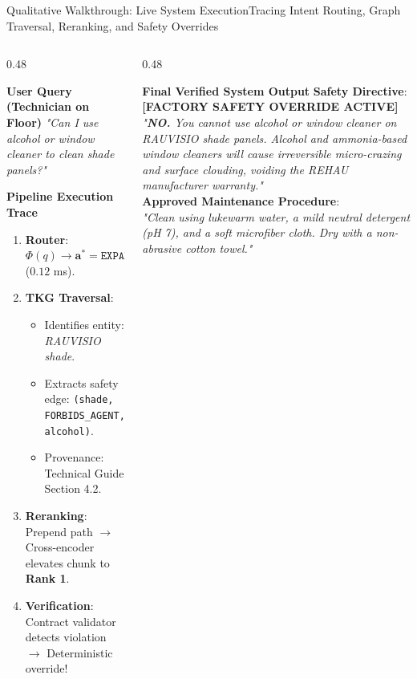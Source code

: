 \documentclass[aspectratio=169,10pt]{beamer}
\begin{document}
\begin{frame}{Qualitative Walkthrough: Live System Execution}{Tracing Intent Routing, Graph Traversal, Reranking, and Safety Overrides}
  \begin{columns}[T]
    \begin{column}{0.48\textwidth}
      \begin{block}{\textbf{User Query (Technician on Floor)}}
        \textit{"Can I use alcohol or window cleaner to clean shade panels?"}
      \end{block}

      \begin{block}{\textbf{Pipeline Execution Trace}}
        \scriptsize
        \begin{enumerate}\setlength\itemsep{0.08ex}
          \item \textbf{Router}: $\Phi(q) \to \mathbf{a}^* = \texttt{EXPAND\_TERMINOLOGY}$ ($0.12$ ms).
          \item \textbf{TKG Traversal}:
            \begin{itemize}\setlength\itemsep{0.02ex}
              \item Identifies entity: \textit{RAUVISIO shade}.
              \item Extracts safety edge: \texttt{(shade, FORBIDS\_AGENT, alcohol)}.
              \item Provenance: Technical Guide Section 4.2.
            \end{itemize}
          \item \textbf{Reranking}:
            Prepend path $\to$ Cross-encoder elevates chunk to \textbf{Rank 1}.
          \item \textbf{Verification}:
            Contract validator detects violation $\to$ Deterministic override!
        \end{enumerate}
      \end{block}
    \end{column}

    \begin{column}{0.48\textwidth}
      \begin{exampleblock}{\textbf{Final Verified System Output}}
        \scriptsize
        \textbf{Safety Directive}: \color{AlertRed}\textbf{[FACTORY SAFETY OVERRIDE ACTIVE]}\color{NeutralDark}\\[0.1ex]
        \textit{"\textbf{NO.} You cannot use alcohol or window cleaner on RAUVISIO shade panels. Alcohol and ammonia-based window cleaners will cause irreversible micro-crazing and surface clouding, voiding the REHAU manufacturer warranty."}\\[0.3ex]
        \textbf{Approved Maintenance Procedure}:\\
        \textit{"Clean using lukewarm water, a mild neutral detergent (pH 7), and a soft microfiber cloth. Dry with a non-abrasive cotton towel."}
      \end{exampleblock}


\end{column}
\end{columns}
\end{frame}
\end{document}
